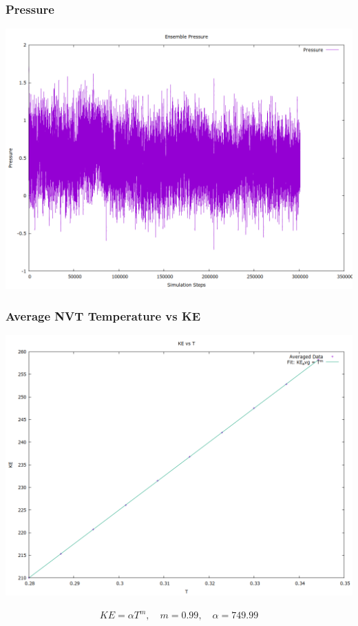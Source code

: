 \documentclass[a4paper,11pt,twoside]{article}
\begin{document}
\subsubsection{Pressure}
\label{sec:org8a5d188}
\begin{center}
\includegraphics[width=.9\linewidth]{../../runs/nvt_cool_sample/plots/N_501_T_0.28/pressure.png}
\end{center}
\subsubsection{Average NVT Temperature vs KE}
\label{sec:org4d65822}
\begin{center}
\includegraphics[width=.9\linewidth]{../../runs/nvt_cool_sample/plots/N_501_T_0.28/TvsKE.png}
\end{center}

\begin{align*}
KE = \alpha T ^ m, \quad m = 0.99, \quad \alpha = 749.99
\end{align*}
\end{document}
